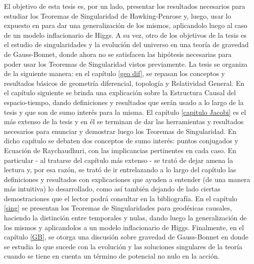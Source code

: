 El objetivo de esta tesis es, por un lado, presentar los resultados necesarios para estudiar los Teoremas de Singularidad de Hawking-Penrose y, luego, usar lo expuesto en \citep{2011CQGra..28l5009F} para dar una generalización de los mismos, aplicandolo luego al caso de un modelo inflacionario de Higgs. A su vez, otro de los objetivos de la tesis es el estudio de singularidades y la evolución del universo en una teoría de gravedad de Gauss-Bonnet, donde ahora no se satisfacen las hipótesis necesarias para poder usar los Teoremas de Singularidad vistos previamente. La tesis se organiza de la siguiente manera: en el capítulo \ref{geo dif}, se repasan los conceptos y resultados básicos de geometría diferencial, topología y Relatividad General. En el capítulo siguiente se brinda una explicación sobre la Estructura Causal del espacio-tiempo, dando definiciones y resultados que serán usado a lo largo de la tesis y que son de sumo interés para la misma. El capítulo \ref{capitulo Jacobi} es el más extenso de la tesis y en él se terminan de dar las herramientas y resultados necesarios para enunciar y demostrar luego los Teoremas de Singularidad. En dicho capítulo se debaten dos conceptos de sumo interés: puntos conjugados y Ecuación de Raychaudhuri, con las implicancias pertinentes en cada caso. En particular - al tratarse del capítulo más extenso - se trató de dejar amena la lectura y, por esa razón, se trató de ir entrelazando a lo largo del capítulo las definiciones y resultados con explicaciones que ayuden a entender (de una manera más intuitiva) lo desarrollado, como así también dejando de lado ciertas demostraciones que el lector podrá consultar en la bibliografía. En el capítulo \ref{sing} se presentan los Teoremas de Singularidades para geodésicas causales, haciendo la distinción entre temporales y nulas, dando luego la generalización de los mismos y aplicandolos a un modelo inflacionario de Higgs. Finalmente, en el capítulo \ref{GB}, se otorga una discusión sobre gravedad de Gauss-Bonnet en donde se estudia lo que sucede con la evolución y las soluciones singulares de la teoría cuando se tiene en cuenta un término de potencial no nulo en la acción.

